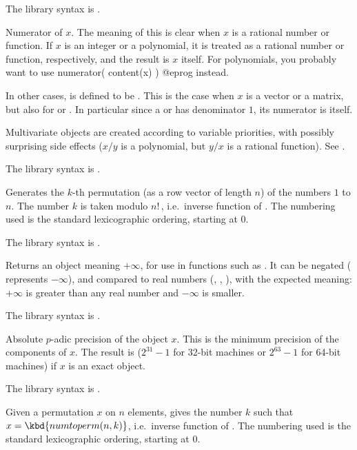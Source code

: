 The library syntax is .

\label{se:numerator}
Numerator of $x$. The meaning of this
is clear when $x$ is a rational number or function. If $x$ is an integer
or a polynomial, it is treated as a rational number or function,
respectively, and the result is $x$ itself. For polynomials, you
probably want to use
\bprog
numerator( content(x) )
@eprog\noindent
instead.

In other cases,  is defined to be
. This is the case when $x$ is a vector or a
matrix, but also for  or . In particular since a
 or  has  denominator $1$, its numerator is
itself.

 Multivariate objects are created according to variable
priorities, with possibly surprising side effects ($x/y$ is a polynomial, but
$y/x$ is a rational function). See .

The library syntax is .

\label{se:numtoperm}
Generates the $k$-th permutation (as a row vector of length $n$) of the
numbers $1$ to $n$. The number $k$ is taken modulo $n!\,$, i.e.~inverse
function of . The numbering used is the standard lexicographic
ordering, starting at $0$.

The library syntax is .

\label{se:oo}
Returns an object meaning $+\infty$, for use in functions such as
. It can be negated ( represents $-\infty$), and
compared to real numbers (, , ), with the
expected meaning: $+\infty$ is greater than any real number and $-\infty$ is
smaller.

The library syntax is .

\label{se:padicprec}
Absolute $p$-adic precision of the object $x$. This is the minimum
precision of the components of $x$. The result is 
($2^{31}-1$ for 32-bit machines or $2^{63}-1$ for 64-bit machines) if $x$ is
an exact object.

The library syntax is .

\label{se:permtonum}
Given a permutation $x$ on $n$ elements, gives the number $k$ such that
$x=\kbd{numtoperm(n,k)}$, i.e.~inverse function of .
The numbering used is the standard lexicographic ordering, starting at $0$.

